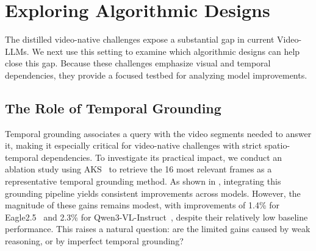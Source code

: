 \documentclass[runningheads]{llncs}
\begin{document}
\section{Exploring Algorithmic Designs}
\label{sec:method}
{    
    The distilled video-native challenges expose a substantial gap in current Video-LLMs.
    We next use this setting to examine which algorithmic designs can help close this gap.
    Because these challenges emphasize visual and temporal dependencies, they provide a focused testbed for analyzing model improvements.
        
    \subsection{The Role of Temporal Grounding}
    \label{sec:5.1}
        Temporal grounding associates a query with the video segments needed to answer it, making it especially critical for video-native challenges with strict spatio-temporal dependencies.
        To investigate its practical impact, we conduct an ablation study using AKS~\cite{aks} to retrieve the 16 most relevant frames as a representative temporal grounding method.        
        As shown in , integrating this grounding pipeline yields consistent improvements across models. 
        However, the magnitude of these gains remains modest, with improvements of 1.4\% for Eagle2.5~\cite{eagle25} and 2.3\% for Qwen3-VL-Instruct~\cite{qwem3_vl}, despite their relatively low baseline performance.
        This raises a natural question: are the limited gains caused by weak reasoning, or by imperfect temporal grounding?
        
}
\end{document}
